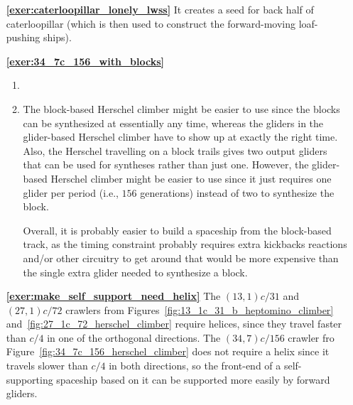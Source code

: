 \begin{multicols}{2}
\begin{itemize}[leftmargin=0em]
		
		\item[\bf\color{ocre}\sffamily\ref{exer:caterloopillar_lonely_lwss}] It creates a seed for back half of caterloopillar (which is then used to construct the forward-moving loaf-pushing ships).\\
		
		
		\item[\bf\color{ocre}\sffamily\ref{exer:34_7c_156_with_blocks}] \begin{enumerate}[leftmargin=1.5em,label=\bf\color{ocre}(\alph*)]
			\item {}\\
			
			\item The block-based Herschel climber might be easier to use since the blocks can be synthesized at essentially any time, whereas the gliders in the glider-based Herschel climber have to show up at exactly the right time. Also, the Herschel travelling on a block trails gives two output gliders that can be used for syntheses rather than just one. However, the glider-based Herschel climber might be easier to use since it just requires one glider per period (i.e., $156$ generations) instead of two to synthesize the block.
			
			Overall, it is probably easier to build a spaceship from the block-based track, as the timing constraint probably requires extra kickbacks reactions and/or other circuitry to get around that would be more expensive than the single extra glider needed to synthesize a block.\\
		\end{enumerate}
	
		\item[\bf\color{ocre}\sffamily\ref{exer:make_self_support_need_helix}] The $(13,1)c/31$ and $(27,1)c/72$ crawlers from Figures~\ref{fig:13_1c_31_b_heptomino_climber} and~\ref{fig:27_1c_72_herschel_climber} require helices, since they travel faster than $c/4$ in one of the orthogonal directions. The $(34,7)c/156$ crawler fro Figure~\ref{fig:34_7c_156_herschel_climber} does not require a helix since it travels slower than $c/4$ in both directions, so the front-end of a self-supporting spaceship based on it can be supported more easily by forward gliders.\\
		

\end{itemize}
\end{multicols}
